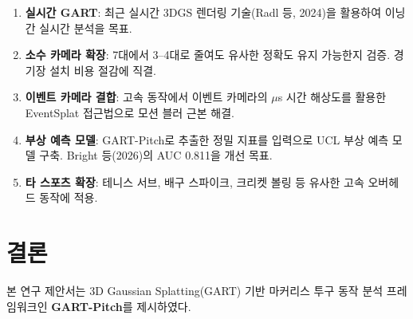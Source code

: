 \documentclass[11pt, a4paper]{report}
\begin{document}
\begin{enumerate}[leftmargin=*]
  \item \textbf{실시간 GART}: 최근 실시간 3DGS 렌더링 기술(Radl 등, 2024)을
        활용하여 이닝 간 실시간 분석을 목표.

  \item \textbf{소수 카메라 확장}: 7대에서 3--4대로 줄여도 유사한 정확도 유지 가능한지 검증.
        경기장 설치 비용 절감에 직결.

  \item \textbf{이벤트 카메라 결합}: 고속 동작에서 이벤트 카메라의 $\mu$s 시간 해상도를
        활용한 EventSplat 접근법으로 모션 블러 근본 해결.

  \item \textbf{부상 예측 모델}: GART-Pitch로 추출한 정밀 지표를 입력으로
        UCL 부상 예측 모델 구축. Bright 등(2026)의 AUC 0.811을 개선 목표.

  \item \textbf{타 스포츠 확장}: 테니스 서브, 배구 스파이크, 크리켓 볼링 등
        유사한 고속 오버헤드 동작에 적용.
\end{enumerate}


\chapter{결론}
\label{ch:conclusion}

본 연구 제안서는 3D Gaussian Splatting(GART) 기반 마커리스 투구 동작 분석 프레임워크인
\textbf{GART-Pitch}를 제시하였다.
\end{document}
